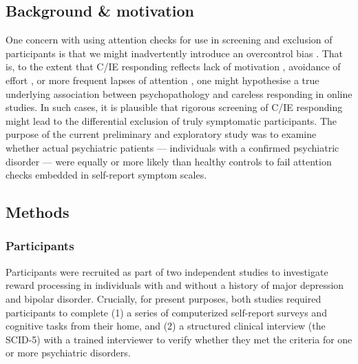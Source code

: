 \documentclass[a4paper,notitlepage,12pt]{article}
\begin{document}
\begin{refsection}[supp]
\subsection*{Background \& motivation}

One concern with using attention checks for use in screening and exclusion of participants is that we might inadvertently introduce an overcontrol bias \cite{elwert2014endogenous-2}. That is, to the extent that C/IE responding reflects lack of motivation \cite{barch2015mechanisms-2}, avoidance of effort \cite{cohen2001impairments-2, culbreth2016negative-2}, or more frequent lapses of attention \cite{kane2016individual-2, robison2017neurotic-2}, one might hypothesise a true underlying association between psychopathology and careless responding in online studies. In such cases, it is plausible that rigorous screening of C/IE responding might lead to the differential exclusion of truly symptomatic participants. The purpose of the current preliminary and exploratory study was to examine whether actual psychiatric patients --- individuals with a confirmed psychiatric disorder --- were equally or more likely than healthy controls to fail attention checks embedded in self-report symptom scales.  

\subsection*{Methods}

\subsubsection*{Participants}

Participants were recruited as part of two independent studies to investigate reward processing in individuals with and without a history of major depression and bipolar disorder. Crucially, for present purposes, both studies required participants to complete (1) a series of computerized self-report surveys and cognitive tasks from their home, and (2) a structured clinical interview (the SCID-5) with a trained interviewer to verify whether they met the criteria for one or more psychiatric disorders. 


\end{refsection}
\end{document}
